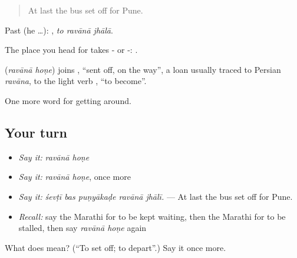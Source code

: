 \begin{quote}
At last the bus set off for Pune.
\end{quote}

Past (he …):   , \emph{to ravānā jhālā}.

The place you head for takes - or -:   .

\begin{cousinweb}
\textbf{ } (\emph{ravānā hoṇe}) joins \textbf{}, \textquotedblleft{}sent off, on the way\textquotedblright{}, a loan usually traced to Persian \emph{ravāna}, to the light verb \textbf{}, \textquotedblleft{}to become\textquotedblright{}.
\end{cousinweb}

\begin{grammarlens}[title={What you've built}]
One more word for getting around.
\end{grammarlens}

\subsection*{Your turn}
\begin{itemize}
\raggedright
  \item \emph{Say it:} \emph{ravānā hoṇe}
  \item \emph{Say it:} \emph{ravānā hoṇe}, once more
  \item \emph{Say it:} \emph{śevṭī bas puṇyākaḍe ravānā jhālī.} — At last the bus set off for Pune.
  \item \emph{Recall:} say the Marathi for to be kept waiting, then the Marathi for to be stalled, then say \emph{ravānā hoṇe} again
\end{itemize}

\begin{tcolorbox}[breakable,colback=teal!4,colframe=teal!35!black,title={Before you move on}]
What does   mean? (\textquotedblleft{}To set off; to depart\textquotedblright{}.) Say it once more.
\end{tcolorbox}
